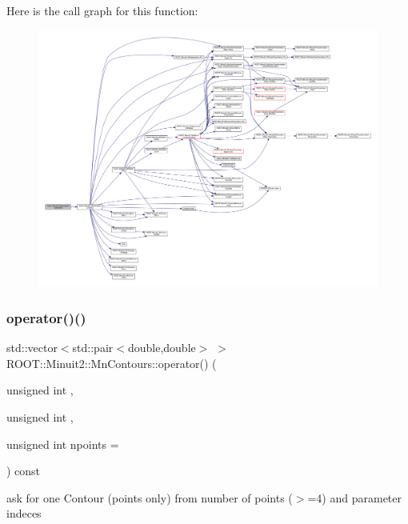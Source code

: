 Here is the call graph for this function\+:
\nopagebreak
\begin{figure}[H]
\begin{center}
\leavevmode
\includegraphics[width=350pt]{d9/de7/classROOT_1_1Minuit2_1_1MnContours_a8a56508ee3dd6f22b7378acf8286debe_cgraph}
\end{center}
\end{figure}
\mbox{\label{classROOT_1_1Minuit2_1_1MnContours_a8d3577d628e22ad0513ed1eb71f8619b}} 
\subsubsection{\texorpdfstring{operator()()}{operator()()}\hspace{0.1cm}{\footnotesize\ttfamily [3/3]}}
{\footnotesize\ttfamily std\+::vector$<$std\+::pair$<$double,double$>$ $>$ R\+O\+O\+T\+::\+Minuit2\+::\+Mn\+Contours\+::operator() (\begin{DoxyParamCaption}\item[{unsigned int}]{,  }\item[{unsigned int}]{,  }\item[{unsigned int}]{npoints = {} }\end{DoxyParamCaption}) const}



ask for one Contour (points only) from number of points ($>$=4) and parameter indeces 

